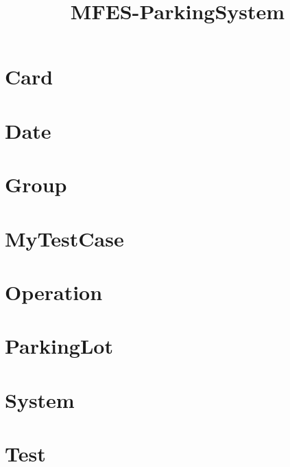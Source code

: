 \documentclass{article}
\begin{document}
\title{MFES-ParkingSystem}
\author{}
\maketitle
\tableofcontents

\section{Card}

\section{Date}

\section{Group}

\section{MyTestCase}

\section{Operation}

\section{ParkingLot}

\section{System}

\section{Test}

\end{document}
